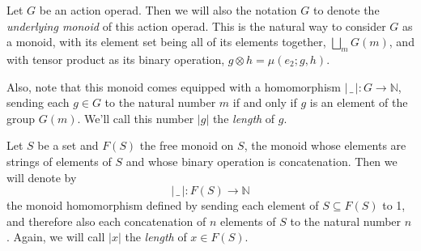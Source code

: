 \documentclass{amsbook} %
\numberwithin{section}{chapter}
\begin{document}
\begin{Defi} Let $G$ be an action operad. Then we will also the notation $G$ to denote the \emph{underlying monoid} of this action operad. This is the natural way to consider $G$ as a monoid, with its element set being all of its elements together, $\bigsqcup_m G(m)$, and with tensor product as its binary operation, $g \otimes h = \mu(e_2; g, h)$.

Also, note that this monoid comes equipped with a homomorphism $| \, \_ \, | : G \to \mathbb{N}$, sending each $g \in G$ to the natural number $m$ if and only if $g$ is an element of the group $G(m)$. We'll call this number $|g|$ the \emph{length} of $g$.
\end{Defi}

\begin{Defi}\label{lengthdef} Let $S$ be a set and $F(S)$ the free monoid on $S$, the monoid whose elements are strings of elements of $S$ and whose binary operation is concatenation. Then we will denote by
\[ | \, \_ \, | : F(S) \to \mathbb{N} \]
the monoid homomorphism defined by sending each element of $S \subseteq F(S)$ to 1, and therefore also each concatenation of $n$ elements of $S$ to the natural number $n$. Again, we will call $|x|$ the \emph{length} of $x \in F(S)$.
\end{Defi}
\end{document}
